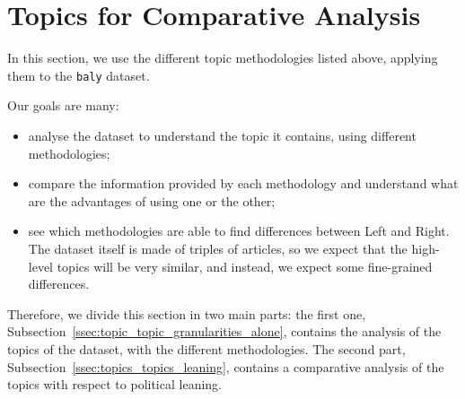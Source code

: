 




\section{\statusorange Topics for Comparative Analysis}
\label{sec:topic_topic_granularities}

In this section, we use the different topic methodologies listed above, applying them to the \texttt{baly} dataset.

Our goals are many:

\begin{itemize}
    \item analyse the dataset to understand the topic it contains, using different methodologies;
    \item compare the information provided by each methodology and understand what are the advantages of using one or the other;
    \item see which methodologies are able to find differences between Left and Right. The dataset itself is made of triples of articles, so we expect that the high-level topics will be very similar, and instead, we expect some fine-grained differences.
\end{itemize}

Therefore, we divide this section in two main parts: the first one, Subsection~\ref{ssec:topic_topic_granularities_alone}, contains the analysis of the topics of the dataset, with the different methodologies. The second part, Subsection~\ref{ssec:topics_topics_leaning}, contains a comparative analysis of the topics with respect to political leaning.

